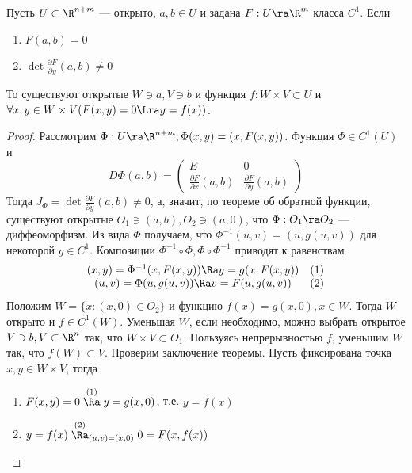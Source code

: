 \begin{theorem}
    Пусть \(U \subset \R^{n + m}\) --- открыто, \(a, b \in U\) и задана \(F: U \ra \R^m\) класса \(C^1\). Если
    \begin{enumerate}
        \item \(F(a, b) = 0\)
        \item \(\det \frac{\partial F}{\partial{y}}(a, b) \ne 0\)
    \end{enumerate}
    То существуют открытые \(W \ni a, V \ni b\) и функция \(f: W \times V \subset U\) и \(\forall x, y \in W \times V (F(x, y) = 0 \Lra y = f(x))\).
\end{theorem}
\begin{proof}
    Рассмотрим \(\Phi: U \ra \R^{n + m}, \Phi(x, y) = (x, F(x, y))\). Функция \(\Phi \in C^1(U)\) и
    \[D\Phi(a, b) = \left( \begin{array}{cccc}
        E & 0 \\
        \frac{\partial F}{\partial x}(a, b) & \frac{\partial F}{\partial y}(a, b)
    \end{array} \right)\]
    Тогда \(J_\Phi = \det \frac{\partial F}{\partial y}(a, b) \ne 0\), а, значит, по теореме об обратной функции, существуют открытые \(O_1 \ni (a, b), O_2 \ni (a, 0)\), что \(\Phi: O_1 \ra O_2\) --- диффеоморфизм. Из вида \(\Phi\) получаем, что \(\Phi^{-1}(u, v) = (u, g(u, v))\) для некоторой \(g \in C^1\). Композиции \(\Phi^{-1} \circ \Phi, \Phi \circ \Phi^{-1}\) приводят к равенствам
    \[\begin{array}{cc}
        (x, y) = \Phi^{-1}(x, F(x, y)) \Ra y = g(x, F(x, y)) & (1) \\
        (u, v) = \Phi(u, g(u, v)) \Ra v = F(u, g(u, v)) & (2)
    \end{array}\]
    Положим \(W = \{x: (x, 0) \in O_2\}\) и функцию \(f(x) = g(x, 0), x \in W\). Тогда \(W\) открыто и \(f \in C^1(W)\). Уменьшая \(W\), если необходимо, можно выбрать открытое \(V \ni b, V \subset \R^n\) так, что \(W \times V \subset O_1\). Пользуясь непрерывностью \(f\), уменьшим \(W\) так, что \(f(W) \subset V\). Проверим заключение теоремы. Пусть фиксирована точка \(x, y \in W \times V\), тогда
    \begin{enumerate}
        \item \(F(x, y) = 0 \stackrel{(1)}{\Ra} y = g(x, 0)\), т.е. \(y = f(x)\)
        \item \(y = f(x) \stackrel{(2)}{\Ra}_{(u, v) = (x, 0)} 0 = F(x, f(x))\)
    \end{enumerate}
\end{proof}

